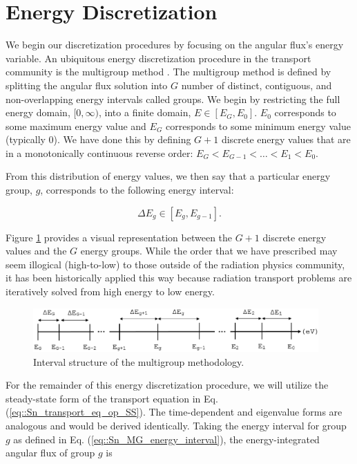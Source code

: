 \section{Energy Discretization}
\label{sec::Sn_MG}

We begin our discretization procedures by focusing on the angular flux's energy variable. An ubiquitous energy discretization procedure in the transport community is the multigroup method \cite{duderstadt1976nuclear,lewis1984computational}. The multigroup method is defined by splitting the angular flux solution into $G$ number of distinct, contiguous, and non-overlapping energy intervals called groups. We begin by restricting the full energy domain, $[0, \infty)$, into a finite domain, $E \in [E_G, E_0]$. $E_0$ corresponds to some maximum energy value and $E_G$ corresponds to some minimum energy value (typically 0). We have done this by defining $G+1$ discrete energy values that are in a monotonically continuous reverse order: $E_G < E_{G-1} <  \ldots < E_1 < E_0$. 

From this distribution of energy values, we then say that a particular energy group, $g$, corresponds to the following energy interval:

\begin{equation}
\label{eq::Sn_MG_energy_interval}
\Delta E_g \in [E_g, E_{g-1}].
\end{equation}

\noindent Figure \ref{fig::Sn_MG_energy_bands} provides a visual representation between the $G+1$ discrete energy values and the $G$ energy groups. While the order that we have prescribed may seem illogical (high-to-low) to those outside of the radiation physics community, it has been historically applied this way because radiation transport problems are iteratively solved from high energy to low energy.

\begin{figure}[bht]
\centering
\includegraphics[width=0.975\textwidth]{figures/sec_Sn/MG_Energy_Bands.eps}
\caption{Interval structure of the multigroup methodology.}
\label{fig::Sn_MG_energy_bands}
\end{figure}

For the remainder of this energy discretization procedure, we will utilize the steady-state form of the transport equation in Eq. (\ref{eq::Sn_transport_eq_op_SS}). The time-dependent and eigenvalue forms are analogous and would be derived identically. Taking the energy interval for group $g$ as defined in Eq. (\ref{eq::Sn_MG_energy_interval}), the energy-integrated angular flux of group $g$ is

